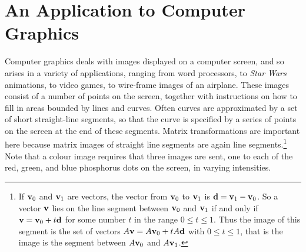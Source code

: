 \section{An Application to Computer Graphics}
\label{sec:4_5}

Computer graphics deals with images 
displayed on a computer screen, and so arises in a variety of 
applications, ranging from word processors, to \textit{Star Wars} 
animations, to video games, to wire-frame images of an airplane.  These 
images consist of a number of points on the screen, together with 
instructions on how to fill in areas bounded by lines and curves. Often 
curves are approximated by a set of short straight-line segments, so 
that the curve is specified by a series of points on the screen at the 
end of these segments. Matrix transformations are important here because
 matrix images of straight line segments are again line segments.\footnote{If $\textbf{v}_{0}$ and $\textbf{v}_{1}$ are vectors, the vector from $\textbf{v}_{0}$ to $\textbf{v}_{1}$ is $\textbf{d} = \textbf{v}_{1} - \textbf{v}_{0}$. So a vector $\textbf{v}$ lies on the line segment between $\textbf{v}_{0}$ and $\textbf{v}_{1}$ if and only if $\textbf{v} = \textbf{v}_{0} + t\textbf{d}$ for some number $t$ in the range $0 \leq t \leq 1$. Thus the image of this segment is the set of vectors $A\textbf{v} = A\textbf{v}_{0} + tA \textbf{d}$ with $0 \leq t \leq 1$, that is the image is the segment between $A\textbf{v}_{0}$ and $A\textbf{v}_{1}$.} Note that a colour image requires that three images are sent, one to 
each of the red, green, and blue phosphorus dots on the screen, in 
varying intensities.

\newpage
\begin{wrapfigure}[34]{l}{4cm} 
\centering

\caption{\label{fig:013289}}
\vspace{1em}

\caption{\label{fig:013290}}
\vspace{1em}

\caption{\label{fig:013296}}
\vspace{1em}

\caption{\label{fig:013297}}
\vspace{1em}

\caption{\label{fig:013303}}
\end{wrapfigure}


